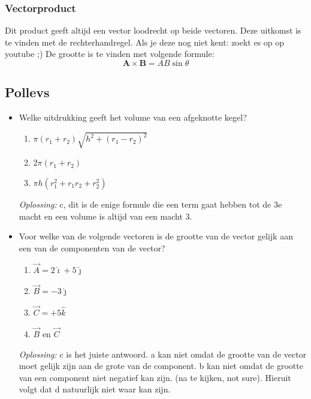 \documentclass[12pt,a4paper]{article}
\begin{document}
    \subsubsection{Vectorproduct}
    Dit product geeft altijd een vector loodrecht op beide vectoren. Deze uitkomst is te vinden met de rechterhandregel. Als je deze nog niet kent: zoekt es op op youtube ;)
    De grootte is te vinden met volgende formule:
    \[\textbf{A} \times \textbf{B} = AB\sin\theta\]

    \subsection{Pollevs}

    \begin{itemize}
        \renewcommand\labelitemi{--}
        \item Welke uitdrukking geeft het volume van een afgeknotte kegel?
        \begin{enumerate}
            [label=\alph*)]
            \item \(\pi(r_1 + r_2)\sqrt{h^2 + (r_1 - r_2)^2}\)
            \item \(2\pi(r_1 + r_2)\)
            \item \(\pi h(r_1^2 + r_1r_2 + r_2^2)\)
        \end{enumerate}
        \textit{Oplossing:} c, dit is de enige formule die een term gaat hebben tot de 3e macht en een volume is altijd van een macht 3.

        \item Voor welke van de volgende vectoren is de grootte van de vector gelijk aan een van de componenten van de vector?
        \begin{enumerate}
            [label = \alph*)]
            \item \(\vec{A} = 2\hat{\imath} + 5\hat{\jmath}\)
            \item \(\vec{B} = -3\hat{\jmath}\)
            \item \(\vec{C} = +5\hat{k}\)
            \item \(\vec{B} \text{ en } \vec{C}\)
        \end{enumerate}
        \textit{Oplossing:} c is het juiste antwoord. a kan niet omdat de grootte van de vector moet gelijk zijn aan de grote van de component. b kan niet omdat de grootte van een component niet negatief kan zijn. (na te kijken, not sure). Hieruit volgt dat d natuurlijk niet waar kan zijn.


\end{itemize}
\end{document}
